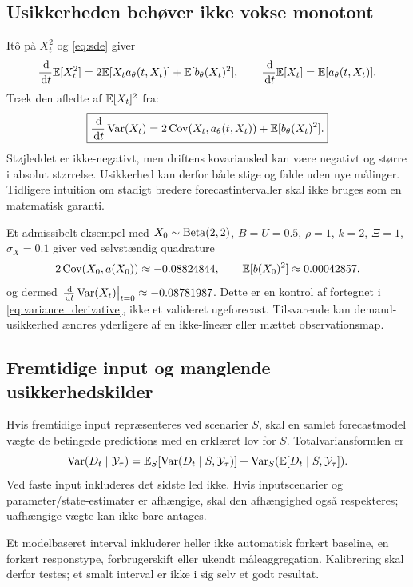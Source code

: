 \subsection{Usikkerheden behøver ikke vokse monotont}
Itô på \(X_t^2\) og \eqref{eq:sde} giver
\[
 \frac{\,\mathrm d}{\,\mathrm d t}\mathbb E[X_t^2]=2\mathbb E[X_ta_\theta(t,X_t)]+\mathbb E[b_\theta(X_t)^2],
 \qquad \frac{\,\mathrm d}{\,\mathrm d t}\mathbb E[X_t]=\mathbb E[a_\theta(t,X_t)].
\]
Træk den afledte af \(\mathbb E[X_t]^2\) fra:
\begin{equation}
 \boxed{\frac{\,\mathrm d}{\,\mathrm d t}\operatorname{Var}(X_t)
 =2\operatorname{Cov}(X_t,a_\theta(t,X_t))+\mathbb E[b_\theta(X_t)^2].}
 \label{eq:variance_derivative}
\end{equation}
Støjleddet er ikke-negativt, men driftens kovariansled kan være negativt og større i absolut størrelse. Usikkerhed kan derfor både stige og falde uden nye målinger. Tidligere intuition om stadigt bredere forecastintervaller skal ikke bruges som en matematisk garanti.

Et admissibelt eksempel med \(X_0\sim\operatorname{Beta}(2,2)\), \(B=U=0.5\), \(\rho=1\), \(k=2\), \(\Xi=1\), \(\sigma_X=0.1\) giver ved selvstændig quadrature
\[
 2\operatorname{Cov}(X_0,a(X_0))\approx-0.08824844,\qquad
 \mathbb E[b(X_0)^2]\approx0.00042857,
\]
og dermed \(\left.\frac{\,\mathrm d}{\,\mathrm d t}\operatorname{Var}(X_t)\right|_{t=0}\approx-0.08781987\).
Dette er en kontrol af fortegnet i \eqref{eq:variance_derivative}, ikke et valideret ugeforecast. Tilsvarende kan demand-usikkerhed ændres yderligere af en ikke-lineær eller mættet observationsmap.

\subsection{Fremtidige input og manglende usikkerhedskilder}
Hvis fremtidige input repræsenteres ved scenarier \(S\), skal en samlet forecastmodel vægte de betingede predictions med en erklæret lov for \(S\). Totalvariansformlen er
\begin{equation}
 \operatorname{Var}(D_t\mid\mathcal Y_\tau)
 =\mathbb E_S[\operatorname{Var}(D_t\mid S,\mathcal Y_\tau)]
  +\operatorname{Var}_S(\mathbb E[D_t\mid S,\mathcal Y_\tau]).
 \label{eq:inputuncertainty}
\end{equation}
Ved faste input inkluderes det sidste led ikke. Hvis inputscenarier og parameter/state-estimater er afhængige, skal den afhængighed også respekteres; uafhængige vægte kan ikke bare antages.

Et modelbaseret interval inkluderer heller ikke automatisk forkert baseline, en forkert responstype, forbrugerskift eller ukendt måleaggregation. Kalibrering skal derfor testes; et smalt interval er ikke i sig selv et godt resultat.

